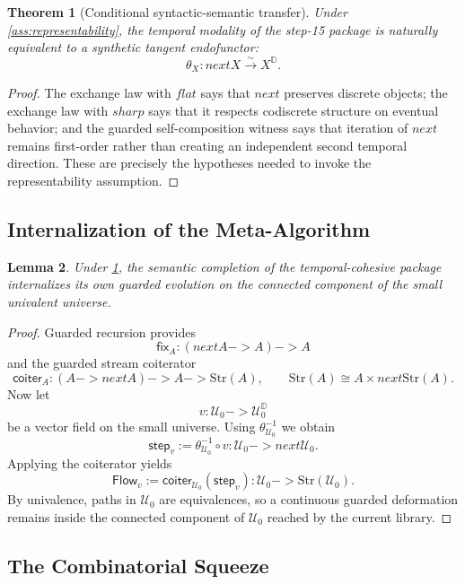 \documentclass[11pt,a4paper]{article}
\def\to{->}%
\def\flat{flat}%
\def\sharp{sharp}%
\def\bigcirc{next}%
\theoremstyle{plain}
\newtheorem{theorem}{Theorem}[section]
\newtheorem{lemma}[theorem]{Lemma}
\theoremstyle{definition}
\theoremstyle{remark}
\newcommand{\D}{\mathbb{D}}
\newcommand{\U}{\mathcal{U}}
\newcommand{\Strm}{\mathrm{Str}}
\begin{document}
\begin{theorem}[Conditional syntactic-semantic transfer]
\label{thm:transfer}
Under \cref{ass:representability}, the temporal modality of the step-15 package is naturally equivalent to a synthetic tangent endofunctor:
\[
  \theta_X:\bigcirc X\overset{\sim}{\longrightarrow}X^\D.
\]
\end{theorem}

\begin{proof}
The exchange law with $\flat$ says that $\bigcirc$ preserves discrete objects; the exchange law with $\sharp$ says that it respects codiscrete structure on eventual behavior; and the guarded self-composition witness says that iteration of $\bigcirc$ remains first-order rather than creating an independent second temporal direction.  These are precisely the hypotheses needed to invoke the representability assumption.
\end{proof}

\subsection{Internalization of the Meta-Algorithm}

\begin{lemma}
\label{lem:internalization}
Under \cref{thm:transfer}, the semantic completion of the temporal-cohesive package internalizes its own guarded evolution on the connected component of the small univalent universe.
\end{lemma}

\begin{proof}
Guarded recursion provides
\[
  \mathsf{fix}_A:(\bigcirc A\to A)\to A
\]
and the guarded stream coiterator
\[
  \mathsf{coiter}_A:(A\to \bigcirc A)\to A\to \Strm(A),
  \qquad
  \Strm(A)\cong A\times \bigcirc\Strm(A).
\]
Now let
\[
  v:\U_0\to \U_0^\D
\]
be a vector field on the small universe.  Using $\theta_{\U_0}^{-1}$ we obtain
\[
  \mathsf{step}_v:=\theta_{\U_0}^{-1}\circ v:\U_0\to \bigcirc \U_0.
\]
Applying the coiterator yields
\[
  \mathsf{Flow}_v:=\mathsf{coiter}_{\U_0}(\mathsf{step}_v):\U_0\to \Strm(\U_0).
\]
By univalence, paths in $\U_0$ are equivalences, so a continuous guarded deformation remains inside the connected component of $\U_0$ reached by the current library.
\end{proof}

\subsection{The Combinatorial Squeeze}
\end{document}

